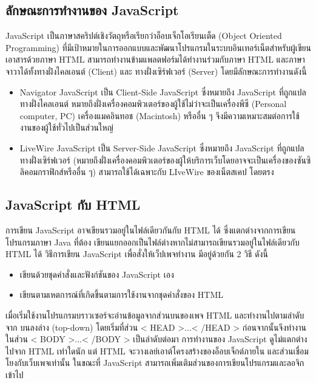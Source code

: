 	 \subsection{ลักษณะการทำงานของ JavaScript}
	 JavaScript เป็นภาษาสคริปต์เชิงวัตถุหรือเรียกว่าอ็อบเจ็กโอเรียนเต็ด (Object Oriented Programming) ที่มีเป้าหมายในการออกแบบและพัฒนาโปรแกรมในระบบอินเทอร์เน็ตสำหรับผู้เขียนเอาสารด้วยภาษา HTML สามารถทำงานข้ามแพลตฟอร์มได้ทำงานร่วมกับภาษา HTML และภาษาจาวาได้ทั้งทางฝั่งไคลเอนต์ (Client) และ ทางฝั่งเซิร์ฟเวอร์ (Server) โดยมีลักษณะการทำงานดังนี้ 
	 \begin{itemize}
		 \item Navigator JavaScript เป็น Client-Side JavaScript ซึ่งหมายถึง JavaScript ที่ถูกแปลทางฝั่งไคลเอนต์ หมายถึงฝั่งเครื่องคอมพิวเตอร์ของผู้ใช้ไม่ว่าจะเป็นเครื่องพีซี (Personal computer, PC) เครื่องแมคอินทอช (Macintosh) หรืออื่น ๆ จึงมีความเหมาะสมต่อการใช้งานของผู้ใช้ทั่วไปเป็นส่วนใหญ่ 
		 \item LiveWire JavaScript เป็น Server-Side JavaScript ซึ่งหมายถึง JavaScript ที่ถูกแปลทางฝั่งเซิร์ฟเวอร์ (หมายถึงฝั่งเครื่องคอมพิวเตอร์ของผู้ให้บริการเว็บโดยอาจจะเป็นเครื่องของซันซิลิคอมกราฟิกส์หรืออื่น ๆ) สามารถใช้ได้เฉพาะกับ LIveWire ของเน็ตสเคป โดยตรง
	 \end{itemize}
	
	 \subsection{JavaScript กับ HTML}
	 การเขียน JavaScript อาจเขียนรวมอยู่ในไฟล์เดียวกันกับ HTML ได้ ซึ่งแตกต่างจากการเขียนโปรแกรมภาษา Java ที่ต้อง เขียนแยกออกเป็นไฟล์ต่างหากไม่สามารถเขียนรวมอยู่ในไฟล์เดียวกับ HTML ได้ วิธีการเขียน JavaScript เพื่อสั่งให้เว็ปเพจทำงาน มีอยู่ด้วยกัน 2 วิธี ดังนี้
	 \begin{itemize}
	 	\item เขียนด้วยชุดคำสั่งและฟังก์ชันของ JavaScript เอง
	 	\item เขียนตามเหตการณ์ที่เกิดขึ้นตามการใช้งานจากชุดคำสั่งของ HTML
	 \end{itemize}
	  เมื่อเริ่มใช้งานโปรแกรมบราวเซอร์จะอ่านข้อมูลจากส่วนบนของเพจ HTML และทำงานไปตามลำดับจาก บนลงล่าง (top-down) โดยเริ่มที่ส่วน < HEAD >...< /HEAD > ก่อนจากนั้นจึงทำงานในส่วน < BODY >...< /BODY > เป็นลำดับต่อมา การทำงานของ JavaScript ดูไม่แตกต่างไปจาก HTML เท่าใดนัก แต่ HTML จะวางเลย์เอาต์โครงสร้างของอ็อบเจ็กต์ภายใน และส่วนเชื่อมโยงกับเว็บเพจเท่านั้น ในขณะที่ JavaScript สามารถเพิ่มเติมส่วนของการเขียนโปรแกรมและลอจิกเข้าไป
	 
